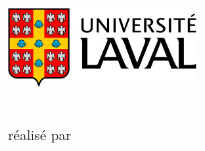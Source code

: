 \thispagestyle{empty}	%
\includegraphics[width=5cm]{./img/logo.jpg}	%
\vspace{4cm}	%
\begin{center}	%
    \setlength{\baselineskip}{2.0\baselineskip}  %
{\huge \bf \titre} \\  %
\vspace{4cm}
\vspace{4cm}
{\large réalisé par \\ \vspace{0.3cm} \auteurs \\ \text{ } \\ \matricules}
\vfill	%
{\large \dateremise} 
\pagebreak
\end{center}
